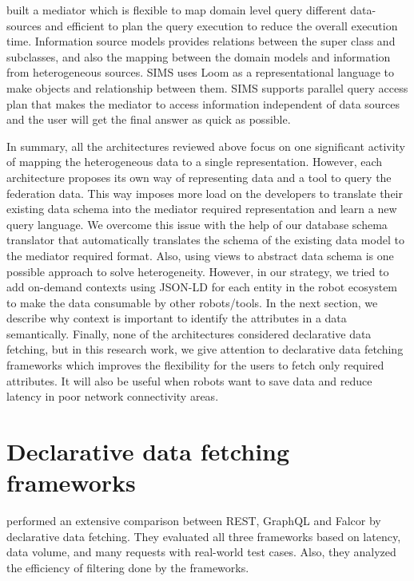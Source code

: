 	\citet{arens1996query} built a mediator which is flexible to map domain level query different data-sources and efficient to plan the query execution to reduce the overall execution time. Information source models provides relations between the super class and subclasses, and also the mapping between the domain models and information from heterogeneous sources. SIMS uses Loom as a representational language to make objects and relationship between them. SIMS supports parallel query access plan that makes the mediator to access information independent of data sources and the user will get the final answer as quick as possible.
	
	In summary, all the architectures reviewed above focus on one significant activity of mapping the heterogeneous data to a single representation. However, each architecture proposes its own way of representing data and a tool to query the federation data. This way imposes more load on the developers to translate their existing data schema into the mediator required representation and learn a new query language. We overcome this issue with the help of our database schema translator that automatically translates the schema of the existing data model to the mediator required format. Also,  using views to abstract data schema is one possible approach to solve heterogeneity. However, in our strategy, we tried to add on-demand contexts using JSON-LD for each entity in the robot ecosystem to make the data consumable by other robots/tools. In the next section, we describe why context is important to identify the attributes in a data semantically. Finally, none of the architectures considered declarative data fetching, but in this research work, we give attention to declarative data fetching frameworks which improves the flexibility for the users to fetch only required attributes. It will also be useful when robots want to save data and reduce latency in poor network connectivity areas.
	
	\section{Declarative data fetching frameworks}
	
	\citet{cederlund2016performance} performed an extensive comparison between REST, GraphQL and Falcor by declarative data fetching. They evaluated all three frameworks based on latency, data volume, and many requests with real-world test cases. Also, they analyzed the efficiency of filtering done by the frameworks.
	

